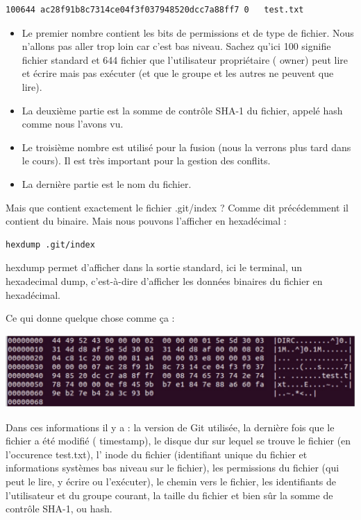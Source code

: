 \documentclass{article}
\begin{document}
\begin{verbatim}
100644 ac28f91b8c7314ce04f3f037948520dcc7a88ff7 0	test.txt
\end{verbatim}
\begin{itemize}
\item Le premier nombre contient les bits de permissions et de type de fichier. Nous n'allons pas aller trop loin car c'est bas niveau. Sachez qu'ici {\color{blue} 100} signifie fichier standard et {\color{blue} 644} fichier que l'utilisateur propriétaire ({\color{blue} owner}) peut lire et écrire mais pas exécuter (et que le groupe et les autres ne peuvent que lire).

\item La deuxième partie est la somme de contrôle {\color{blue} SHA-1} du fichier, appelé {\color{blue} hash} comme nous l'avons vu.

\item Le troisième nombre est utilisé pour la fusion (nous la verrons plus tard dans le cours). Il est très important pour la gestion des conflits.

\item La dernière partie est le nom du fichier.
\end{itemize}


Mais que contient exactement le fichier {\color{blue} .git/index} ? Comme dit précédemment il contient du binaire. Mais nous pouvons l'afficher en hexadécimal :

\begin{verbatim}
hexdump .git/index
\end{verbatim}

hexdump permet d'afficher dans la sortie standard, ici le terminal, un hexadecimal dump, c'est-à-dire d'afficher les données binaires du fichier en hexadécimal.

Ce qui donne quelque chose comme ça :
\begin{center}
\includegraphics[scale=0.25]{image02.jpg} 
\end{center}

Dans ces informations il y a : la version de {\color{blue} Git} utilisée, la dernière fois que le fichier a été modifié ({\color{blue} timestamp}), le disque dur sur lequel se trouve le fichier (en l'occurence {\color{blue} test.txt}), l'{\color{blue} inode} du fichier (identifiant unique du fichier et informations systèmes bas niveau sur le fichier), les permissions du fichier (qui peut le lire, y écrire ou l'exécuter), le chemin vers le fichier, les identifiants de l'utilisateur et du groupe courant, la taille du fichier et bien sûr la somme de contrôle {\color{blue} SHA-1}, ou {\color{blue} hash}.
\end{document}
